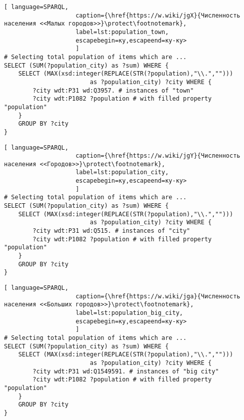 \begin{lstlisting}[ language=SPARQL, 
                    caption={\href{https://w.wiki/jgX}{Численность населения <<Малых городов>>}\protect\footnotemark},
                    label=lst:population_town, 
                    escapebegin=ку,escapeend=ку-ку>
                    ]
# Selecting total population of items which are ...
SELECT (SUM(?population_city) as ?sum) WHERE {                    
	SELECT (MAX(xsd:integer(REPLACE(STR(?population),"\\.",""))) 
						as ?population_city) ?city WHERE {
		?city wdt:P31 wd:Q3957.	# instances of "town"
		?city wdt:P1082 ?population # with filled property "population"                                  
	}
	GROUP BY ?city
}
\end{lstlisting}

\begin{lstlisting}[ language=SPARQL, 
                    caption={\href{https://w.wiki/jgY}{Численность населения <<Городов>>}\protect\footnotemark},
                    label=lst:population_city, 
                    escapebegin=ку,escapeend=ку-ку>
                    ]
# Selecting total population of items which are ...
SELECT (SUM(?population_city) as ?sum) WHERE {                    
	SELECT (MAX(xsd:integer(REPLACE(STR(?population),"\\.",""))) 
						as ?population_city) ?city WHERE {
		?city wdt:P31 wd:Q515. # instances of "city"
		?city wdt:P1082 ?population # with filled property "population"
	}
	GROUP BY ?city
}\end{lstlisting}

\begin{lstlisting}[ language=SPARQL, 
                    caption={\href{https://w.wiki/jga}{Численность населения <<Больших городов>>}\protect\footnotemark},
                    label=lst:population_big_city, 
                    escapebegin=ку,escapeend=ку-ку>
                    ]
# Selecting total population of items which are ...
SELECT (SUM(?population_city) as ?sum) WHERE {                    
	SELECT (MAX(xsd:integer(REPLACE(STR(?population),"\\.",""))) 
						as ?population_city) ?city WHERE {
		?city wdt:P31 wd:Q1549591. # instances of "big city"
		?city wdt:P1082 ?population # with filled property "population"
	}
	GROUP BY ?city
}
\end{lstlisting}

